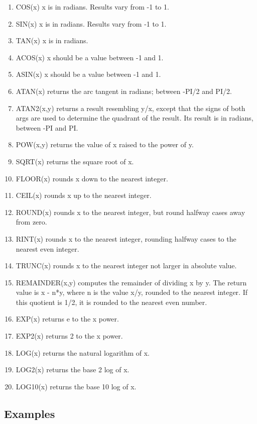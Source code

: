 \begin{enumerate}
\item COS(x) x is in radians. Results vary from -1 to 1.
\item SIN(x) x is in radians. Results vary from -1 to 1.
\item TAN(x) x is in radians.
\item ACOS(x) x should be a value between -1 and 1.
\item ASIN(x) x should be a value between -1 and 1.
\item ATAN(x) returns the arc tangent in radians; between -PI/2 and PI/2.
\item ATAN2(x,y) returns a result resembling y/x, except that the signs of both args are used to determine the quadrant of the result. Its result is in radians, between -PI and PI.
\item POW(x,y) returns the value of x raised to the power of y.
\item SQRT(x) returns the square root of x.
\item FLOOR(x) rounds x down to the nearest integer.
\item CEIL(x) rounds x up to the nearest integer.
\item ROUND(x) rounds x to the nearest integer, but round halfway cases away from zero.
\item RINT(x) rounds x to the nearest integer, rounding halfway cases to the nearest even integer.
\item TRUNC(x) rounds x to the nearest integer not larger in absolute value.
\item REMAINDER(x,y) computes the remainder of dividing x by y. The return value is x - n*y, where n is the value x/y, rounded to the nearest integer. If this quotient is 1/2, it is rounded to the nearest even number.
\item EXP(x) returns e to the x power.
\item EXP2(x) returns 2 to the x power.
\item LOG(x) returns the natural logarithm of x.
\item LOG2(x) returns the base 2 log of x.
\item LOG10(x) returns the base 10 log of x.
\end{enumerate}

\subsection{Examples}

